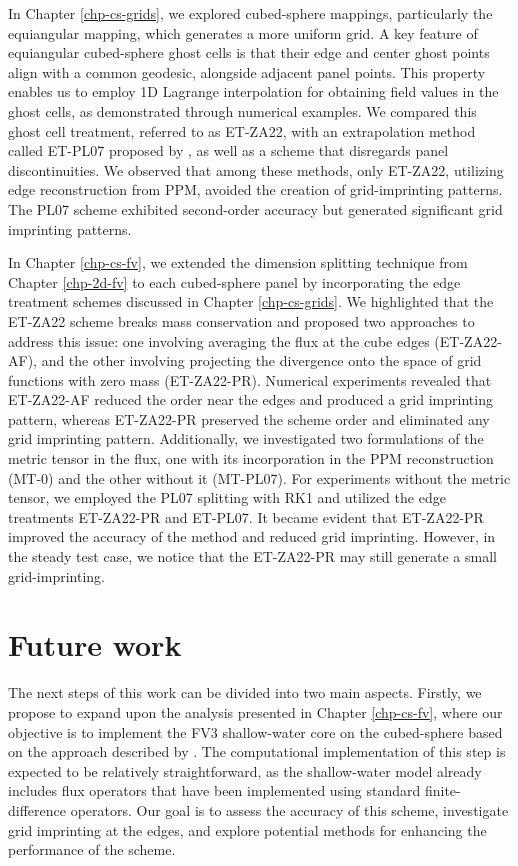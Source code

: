 In Chapter \ref{chp-cs-grids}, we explored cubed-sphere mappings, particularly the equiangular mapping, which generates a more uniform grid.
A key feature of equiangular cubed-sphere ghost cells is that their edge and center ghost points align with a common geodesic, alongside adjacent panel points.
This property enables us to employ 1D Lagrange interpolation for obtaining field values in the ghost cells, as demonstrated through numerical examples.
We compared this ghost cell treatment, referred to as ET-ZA22, with an extrapolation method called ET-PL07 proposed by \citet{putman:2007},
as well as a scheme that disregards panel discontinuities.
We observed that among these methods, only ET-ZA22, utilizing edge reconstruction from PPM, avoided the creation of grid-imprinting patterns.
The PL07 scheme exhibited second-order accuracy but generated significant grid imprinting patterns.

In Chapter \ref{chp-cs-fv}, we extended the dimension splitting technique from Chapter \ref{chp-2d-fv} 
to each cubed-sphere panel by incorporating the edge treatment schemes discussed in Chapter \ref{chp-cs-grids}.
We highlighted that the ET-ZA22 scheme breaks mass conservation and proposed two approaches to address this issue:
one involving averaging the flux at the cube edges (ET-ZA22-AF), and the other involving projecting the divergence
onto the space of grid functions with zero mass (ET-ZA22-PR).
Numerical experiments revealed that ET-ZA22-AF reduced the order near the edges and produced a grid imprinting pattern,
whereas ET-ZA22-PR preserved the scheme order and eliminated any grid imprinting pattern.
Additionally, we investigated two formulations of the metric tensor in the flux, one with its incorporation in the PPM reconstruction (MT-0) and the other without it (MT-PL07).
For experiments without the metric tensor, we employed the PL07 splitting with RK1 and utilized the edge treatments ET-ZA22-PR and ET-PL07.
It became evident that ET-ZA22-PR improved the accuracy of the method and reduced grid imprinting. However, in the steady test case, we notice that the ET-ZA22-PR may still
generate a small grid-imprinting.

\newpage
\section{Future work}
The next steps of this work can be divided into two main aspects.
Firstly, we propose to expand upon the analysis presented in Chapter \ref{chp-cs-fv},
where our objective is to implement the FV3 shallow-water core on the cubed-sphere based on the approach described by \citet{lin:1997}.
The computational implementation of this step is expected to be relatively straightforward,
as the shallow-water model already includes flux operators that have been implemented using
standard finite-difference operators. Our goal is to assess the accuracy of this scheme,
investigate grid imprinting at the edges, and explore potential methods for enhancing the performance of the scheme.

